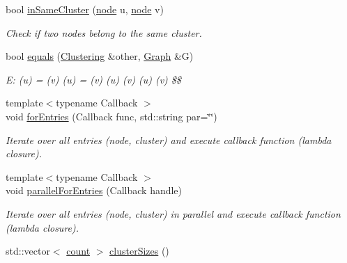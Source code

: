 \begin{DoxyCompactItemize}
bool \hyperlink{class_ensemble_clustering_1_1_clustering_a16c268a2020e4d8f6766d44556697e1d}{in\-Same\-Cluster} (\hyperlink{namespace_ensemble_clustering_ae829290aeccd1a420b17a37fd901f114}{node} u, \hyperlink{namespace_ensemble_clustering_ae829290aeccd1a420b17a37fd901f114}{node} v)
\begin{DoxyCompactList}\small\item\em Check if two nodes belong to the same cluster. \end{DoxyCompactList}\item 
bool \hyperlink{class_ensemble_clustering_1_1_clustering_a1ae12fcdc2549a6826ced64675a56e80}{equals} (\hyperlink{class_ensemble_clustering_1_1_clustering}{Clustering} \&other, \hyperlink{class_ensemble_clustering_1_1_graph}{Graph} \&G)
\begin{DoxyCompactList}\small\item\em E\-: (u) = (v)  (u) = (v)  (u)  (v)  (u)  (v) \$\$ \end{DoxyCompactList}\item 
{\footnotesize template$<$typename Callback $>$ }\\void \hyperlink{class_ensemble_clustering_1_1_clustering_ac73ad4ef868aa0b851f768f1a74186b7}{for\-Entries} (Callback func, std\-::string par=\char`\"{}\char`\"{})
\begin{DoxyCompactList}\small\item\em Iterate over all entries (node, cluster) and execute callback function (lambda closure). \end{DoxyCompactList}\item 
{\footnotesize template$<$typename Callback $>$ }\\void \hyperlink{class_ensemble_clustering_1_1_clustering_ace9debc0ddc3de9f505ab33f9490c7c6}{parallel\-For\-Entries} (Callback handle)
\begin{DoxyCompactList}\small\item\em Iterate over all entries (node, cluster) in parallel and execute callback function (lambda closure). \end{DoxyCompactList}\item 
std\-::vector$<$ \hyperlink{namespace_ensemble_clustering_a2482e94ca22a0c6544a5a9173186fde8}{count} $>$ \hyperlink{class_ensemble_clustering_1_1_clustering_aecf64e29e7032bdcac3f90fa76df2b0b}{cluster\-Sizes} ()
\end{DoxyCompactItemize}
